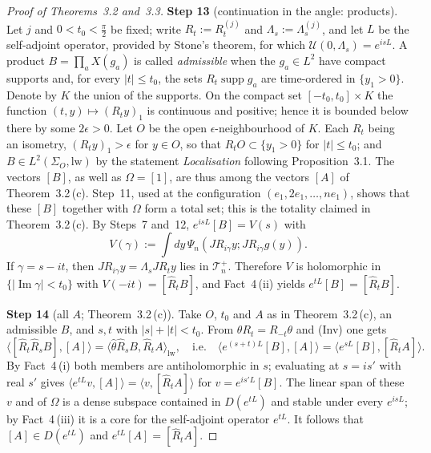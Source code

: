 \documentclass[11pt]{amsart}
\theoremstyle{definition}
\begin{document}
\begin{proof}[Proof of Theorems~3.2 and~3.3]
\textbf{Step 13} (continuation in the angle: products).
Let $j$ and $0<t_0<\frac\pi2$ be fixed; write $R_t:=R^{(j)}_t$ and $\Lambda_s:=\Lambda^{(j)}_s$, and let $L$ be the self-adjoint operator, provided by Stone's theorem, for which $\mathcal U(0,\Lambda_s)=e^{isL}$.
A product $B=\prod_aX(g_a)$ is called \emph{admissible} when the $g_a\in L^2$ have compact supports and, for every $|t|\le t_0$, the sets $R_t\operatorname{supp}g_a$ are time-ordered in $\{y_1>0\}$.
Denote by $K$ the union of the supports.
On the compact set $[-t_0,t_0]\times K$ the function $(t,y)\mapsto(R_ty)_1$ is continuous and positive; hence it is bounded below there by some $2\epsilon>0$.
Let $O$ be the open $\epsilon$-neighbourhood of $K$.
Each $R_t$ being an isometry, $(R_ty)_1>\epsilon$ for $y\in O$, so that $R_tO\subset\{y_1>0\}$ for $|t|\le t_0$; and $B\in L^2(\Sigma_O,\mathrm{lw})$ by the statement \emph{Localisation} following Proposition~3.1.
The vectors $[B]$, as well as $\Omega=[1]$, are thus among the vectors $[A]$ of Theorem~3.2\,(c).
Step~11, used at the configuration $(e_1,2e_1,\dots,ne_1)$, shows that these $[B]$ together with $\Omega$ form a total set; this is the totality claimed in Theorem~3.2\,(c).
By Steps~7 and~12, $e^{isL}[B]=V(s)$ with
\begin{equation*}
V(\gamma):=\int dy\,\Psi_n(JR_{i\gamma}y;JR_{i\gamma}g(y)).
\end{equation*}
If $\gamma=s-it$, then $JR_{i\gamma}y=\Lambda_sJR_ty$ lies in $\mathcal T_n^+$.
Therefore $V$ is holomorphic in $\{|\operatorname{Im}\gamma|<t_0\}$ with $V(-it)=[\hat R_tB]$, and Fact~4\,(ii) yields $e^{tL}[B]=[\hat R_tB]$.

\textbf{Step 14} (all $A$; Theorem~3.2\,(c)).
Take $O$, $t_0$ and $A$ as in Theorem~3.2\,(c), an admissible $B$, and $s,t$ with $|s|+|t|<t_0$.
From $\theta R_t=R_{-t}\theta$ and (Inv) one gets
\begin{equation*}
\langle[\hat R_t\hat R_sB],[A]\rangle=\langle\hat\theta\hat R_sB,\hat R_tA\rangle_{\mathrm{lw}},\quad\text{i.e.}\quad\langle e^{(s+t)L}[B],[A]\rangle=\langle e^{sL}[B],[\hat R_tA]\rangle.
\end{equation*}
By Fact~4\,(i) both members are antiholomorphic in $s$; evaluating at $s=is'$ with real $s'$ gives $\langle e^{tL}v,[A]\rangle=\langle v,[\hat R_tA]\rangle$ for $v=e^{is'L}[B]$.
The linear span of these $v$ and of $\Omega$ is a dense subspace contained in $D(e^{tL})$ and stable under every $e^{isL}$; by Fact~4\,(iii) it is a core for the self-adjoint operator $e^{tL}$.
It follows that $[A]\in D(e^{tL})$ and $e^{tL}[A]=[\hat R_tA]$.


\end{proof}
\end{document}
